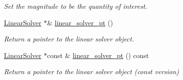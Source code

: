 \begin{DoxyCompactItemize}
\begin{DoxyCompactList}\small\item\em Set the magnitude to be the quantity of interest. \end{DoxyCompactList}\item 
\hyperlink{classoomph_1_1LinearSolver}{Linear\+Solver} $\ast$\& \hyperlink{classoomph_1_1ARPACK_a2118c6975be7d72dada95331201d518a}{linear\+\_\+solver\+\_\+pt} ()
\begin{DoxyCompactList}\small\item\em Return a pointer to the linear solver object. \end{DoxyCompactList}\item 
\hyperlink{classoomph_1_1LinearSolver}{Linear\+Solver} $\ast$const  \& \hyperlink{classoomph_1_1ARPACK_a48d9a6ff92914c0126dbfa85815b7d1f}{linear\+\_\+solver\+\_\+pt} () const
\begin{DoxyCompactList}\small\item\em Return a pointer to the linear solver object (const version) \end{DoxyCompactList}\end{DoxyCompactItemize}
